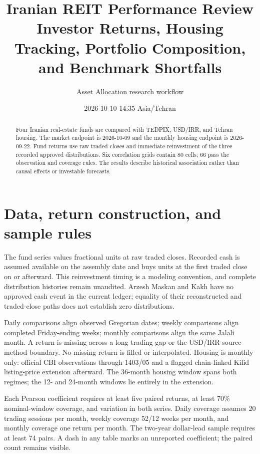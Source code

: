 \documentclass[11pt,a4paper]{article}
\title{\textbf{Iranian REIT Performance Review}\\\large Investor Returns, Housing Tracking, Portfolio Composition, and Benchmark Shortfalls}
\author{Asset Allocation research workflow}
\date{2026-10-10 14:35 Asia/Tehran}
\begin{document}
\maketitle

\tableofcontents

\newpage

\begin{abstract}

Four Iranian real-estate funds are compared with TEDPIX, USD/IRR, and Tehran housing. The market endpoint is 2026-10-09 and the monthly housing endpoint is 2026-09-22. Fund returns use raw traded closes and immediate reinvestment of the three recorded approved distributions. Six correlation grids contain 80 cells; 66 pass the observation and coverage rules. The results describe historical association rather than causal effects or investable forecasts.

\end{abstract}

\section{Data, return construction, and sample rules}

The fund series values fractional units at raw traded closes. Recorded cash is assumed available on the assembly date and buys units at the first traded close on or afterward. This reinvestment timing is a modeling convention, and complete distribution histories remain unaudited. Arzesh Maskan and Kakh have no approved cash event in the current ledger; equality of their reconstructed and traded-close paths does not establish zero distributions.

Daily comparisons align observed Gregorian dates; weekly comparisons align completed Friday-ending weeks; monthly comparisons align the same Jalali month. A return is missing across a long trading gap or the USD/IRR source-method boundary. No missing return is filled or interpolated. Housing is monthly only: official CBI observations through 1403/05 and a flagged chain-linked Kilid listing-price extension afterward. The 36-month housing window spans both regimes; the 12- and 24-month windows lie entirely in the extension.

Each Pearson coefficient requires at least five paired returns, at least 70\% nominal-window coverage, and variation in both series. Daily coverage assumes 20 trading sessions per month, weekly coverage 52/12 weeks per month, and monthly coverage one return per month. The two-year dollar-lead sample requires at least 74 pairs. A dash in any table marks an unreported coefficient; the paired count remains visible.
\end{document}
